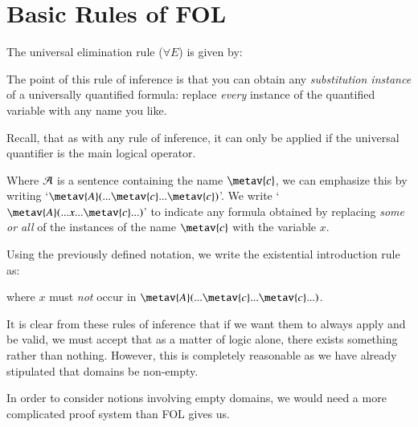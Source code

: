 \documentclass[12pt, a4paper, twoside, openright, titlepage]{book}
\begin{document}
\section{\textsection Basic Rules of FOL}

\begin{defn}{}{}
    The universal elimination rule ($\forall E$) is given by:
    \begin{fitchproof}
         
    \end{fitchproof}
\end{defn}

The point of this rule of inference is that you can obtain any \emph{substitution instance} of a universally quantified formula: replace \emph{every} instance of the quantified variable with any name you like.

Recall, that as with any rule of inference, it can only be applied if the universal quantifier is the main logical operator.

\begin{defn}{}{}
    Where $\mathcal{A}$ is a sentence containing the name $\metav{c}$, we can emphasize this by writing `$\metav{A}(...\metav{c}...\metav{c})$'. We write `$\metav{A}(...x...\metav{c}...)$' to indicate any formula obtained by replacing \emph{some or all} of the instances of the name $\metav{c}$ with the variable $x$.
\end{defn}

\begin{defn}{}{}
    Using the previously defined notation, we write the existential introduction rule as: 
    \begin{fitchproof}
         
    \end{fitchproof}
    where $x$ must \emph{not} occur in $\metav{A}(...\metav{c}...\metav{c}...)$.
\end{defn}

\begin{rmk}{}{}
    It is clear from these rules of inference that if we want them to always apply and be valid, we must accept that as a matter of logic alone, there exists something rather than nothing. However, this is completely reasonable as we have already stipulated that domains be non-empty.

    In order to consider notions involving empty domains, we would need a more complicated proof system than FOL gives us.
\end{rmk}
\end{document}
